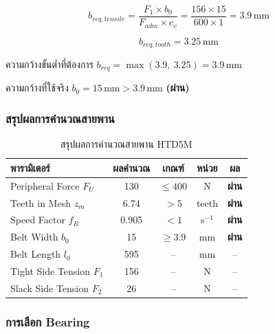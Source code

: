 \begin{equation}
  b_{req,tensile} = \frac{F_1 \times b_0}{F_{adm} \times c_v}
                 = \frac{156 \times 15}{600 \times 1}
                 = 3.9\,\text{mm}
  \label{eq:belt_breq_tensile}
\end{equation}

\begin{equation}
  b_{req,tooth} = 3.25\,\text{mm}
  \label{eq:belt_breq_tooth}
\end{equation}

ความกว้างขั้นต่ำที่ต้องการ
$b_{req} = \max(3.9,\ 3.25) = 3.9\,\text{mm}$

ความกว้างที่ใช้จริง $b_0 = 15\,\text{mm} > 3.9\,\text{mm}$
\textbf{(ผ่าน)}

\subsubsection{สรุปผลการคำนวณสายพาน}

\begin{table}[H]
  \centering
  \caption{สรุปผลการคำนวณสายพาน HTD5M}
  \label{tab:belt_summary}
  \begin{tabular}{lcccc}
    \toprule
    พารามิเตอร์ & ผลคำนวณ & เกณฑ์ & หน่วย & ผล \\
    \midrule
    Peripheral Force $F_U$
      & 130 & $\leq 400$ & N & \textbf{ผ่าน} \\
    Teeth in Mesh $z_m$
      & 6.74 & $> 5$ & teeth & \textbf{ผ่าน} \\
    Speed Factor $f_R$
      & 0.905 & $< 1$ & s$^{-1}$ & \textbf{ผ่าน} \\
    Belt Width $b_0$
      & 15 & $\geq 3.9$ & mm & \textbf{ผ่าน} \\
    Belt Length $l_0$
      & 595 & -- & mm & -- \\
    Tight Side Tension $F_1$
      & 156 & -- & N & -- \\
    Slack Side Tension $F_2$
      & 26  & -- & N & -- \\
    \bottomrule
  \end{tabular}
\end{table}

\subsubsection{การเลือก Bearing}
\label{subsubsec:bearing_selection}

